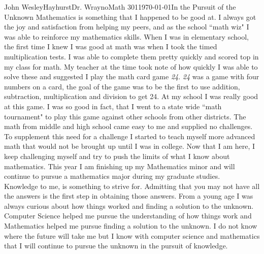 \documentclass[12pt]{article}
\begin{document}
\begin{mla}{John Wesley}{Hayhurst}{Dr. Wrayno}{Math 301}{\today}{In the Pursuit of the Unknown}
Mathematics is something that I happened to be good at. I always got the joy and satisfaction from helping my peers, and as the school ``math wiz" I was able to reinforce my mathematics skills. When I was in elementary school, the first time I knew I was good at math was when I took the timed multiplication tests. I was able to complete them pretty quickly and scored top in my class for math. My teacher at the time took note of how quickly I was able to solve these and suggested I play the math card game \textit{24}. \textit{24} was a game with four numbers on a card, the goal of the game was to be the first to use addition, subtraction, multiplication and division to get 24. At my school I was really good at this game. I was so good in fact, that I went to a state wide ``math tournament" to play this game against other schools from other districts. The math from middle and high school came easy to me and supplied no challenges. To supplement this need for a challenge I started to teach myself more advanced math that would not be brought up until I was in college. Now that I am here, I keep challenging myself and try to push the limits of what I know about mathematics. This year I am finishing up my Mathematics minor and will continue to pursue a mathematics major during my graduate studies.\\

Knowledge to me, is something to strive for. Admitting that you may not have all the answers is the first step in obtaining those answers. From a young age I was always curious about how things worked and finding a solution to the unknown. Computer Science helped me pursue the understanding of how things work and Mathematics helped me pursue finding a solution to the unknown. I do not know where the future will take me but I know with computer science and mathematics that I will continue to pursue the unknown in the pursuit of knowledge.
\end {mla}
\end{document}
